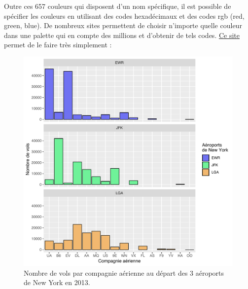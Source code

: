 \documentclass[
  a4paper,
]{article}
\newenvironment{Shaded}{\begin{snugshade}}{\end{snugshade}}
\newcommand{\CharTok}[1]{\textcolor[rgb]{0.57,0.30,0.62}{#1}}
\newcommand{\DataTypeTok}[1]{\textcolor[rgb]{0.00,0.34,0.68}{#1}}
\newcommand{\DecValTok}[1]{\textcolor[rgb]{0.69,0.50,0.00}{#1}}
\newcommand{\KeywordTok}[1]{\textcolor[rgb]{0.12,0.11,0.11}{\textbf{#1}}}
\newcommand{\NormalTok}[1]{\textcolor[rgb]{0.12,0.11,0.11}{#1}}
\newcommand{\OperatorTok}[1]{\textcolor[rgb]{0.12,0.11,0.11}{#1}}
\newcommand{\StringTok}[1]{\textcolor[rgb]{0.75,0.01,0.01}{#1}}
\begin{document}
Outre ces 657 couleurs qui disposent d'un nom spécifique, il est possible de spécifier les couleurs en utilisant des codes hexadécimaux et des codes rgb (red, green, blue). De nombreux sites permettent de choisir n'importe quelle couleur dans une palette qui en compte des millions et d'obtenir de tels codes. \href{https://www.color-hex.com}{Ce site} permet de le faire très simplement :

\begin{Shaded}
\end{Shaded}

\begin{figure}[htpb]

{\centering \includegraphics[width=0.9\linewidth]{figure/barfacethex-1} 

}

\caption{Nombre de vols par compagnie aérienne au départ des 3 aéroports de New York en 2013.}\label{fig:barfacethex}
\end{figure}
\end{document}
